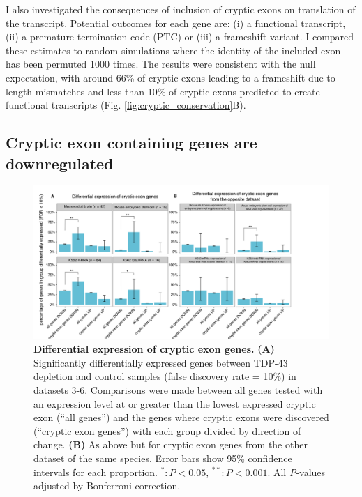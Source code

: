 I also investigated the consequences of inclusion of cryptic exons on translation of the transcript. Potential outcomes for each gene are: (i) a functional transcript, (ii) a premature termination code (PTC) or (iii) a frameshift variant. I compared these estimates to random simulations where the identity of the included exon has been permuted 1000 times. The results were consistent with the null expectation, with around 66\% of cryptic exons leading to a frameshift due to length mismatches and less than 10\% of cryptic exons predicted to create functional transcripts (Fig. \ref{fig:cryptic_conservation}B).


\subsection{Cryptic exon containing genes are downregulated}

\begin{figure}[h!]
	\centering
	\includegraphics[width=\textwidth, trim = {0.2cm 0 3cm 0}, clip]{Figures/03_cryptic_exons/Figure_5_Gene_Expression.png}
	\caption[Differential expression of cryptic exon genes]{
		\textbf{Differential expression of cryptic exon genes.}
	\textbf{(A)} Significantly differentially expressed genes between TDP-43 depletion and control samples (false discovery rate = 10\%) in datasets 3-6. Comparisons were made between all genes tested with an expression level at or greater than the lowest expressed cryptic exon (``all genes'') and the genes where cryptic exons were discovered (``cryptic exon genes'') with each group divided by direction of change. 
	\textbf{(B)} As above but for cryptic exon genes from the other dataset of the same species. Error bars show 95\% confidence intervals for each proportion. $^* : P < 0.05$, $^{**} : P < 0.001$. All \textit{P}-values adjusted by Bonferroni correction.
}	
	\label{fig:cryptic_expression}
\end{figure}


